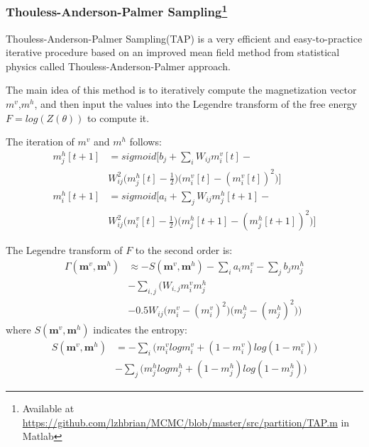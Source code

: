 
\subsubsection{Thouless-Anderson-Palmer Sampling\protect\footnote{Available at \protect\url{https://github.com/lzhbrian/MCMC/blob/master/src/partition/TAP.m} in Matlab}}

Thouless-Anderson-Palmer Sampling(TAP)\cite{gabrie2015training} is a very efficient and easy-to-practice iterative procedure based on an improved mean field method from statistical physics called Thouless-Anderson-Palmer approach.

The main idea of this method is to iteratively compute the magnetization vector $m^{v}$,$m^{h}$, and then input the values into the Legendre transform of the free energy $F=log(Z(\theta))$ to compute it.

The iteration of $m^{v}$ and $m^{h}$ follows:
\begin{equation}
\begin{aligned}
m^{h}_{j}{[t+1]} & = sigmoid\Bigg[b_{j} + \sum_{i}W_{ij}m^{v}_{i}{[t]} - \\
& W^{2}_{ij} \Bigg(m^{h}_{j}{[t] - \frac{1}{2}} \Bigg) \Big(m^{v}_{i}{[t]}-(m^{v}_{i}{[t]})^{2} \Big) \Bigg] \\ 
m^{h}_{i}{[t+1]} & = sigmoid\Bigg[a_{i} + \sum_{j}W_{ij}m^{h}_{j}{[t+1]} - \\
& W^{2}_{ij} \Bigg(m^{v}_{i}{[t] - \frac{1}{2}} \Bigg) \Big(m^{h}_{j}{[t+1]}-(m^{h}_{j}{[t+1]})^{2} \Big) \Bigg]
\end{aligned}
\end{equation}

The Legendre transform of $F$ to the second order is:
\begin{equation}
\begin{split}
\Gamma(\mathbf m^{v},\mathbf m^{h}) &\approx - S(\mathbf m^{v},\mathbf m^{h}) - \sum_{i} a_{i}m^{v}_{i} - \sum_{j} b_{j}m^{h}_{j} \\
& - \sum_{i,j} \Bigg( W_{i,j}m^{v}_{i}m^{h}_{j} \\
& - 0.5W_{ij}\Big(m^{v}_{i}-(m^{v}_{i})^2\Big)\Big(m^{h}_{j}-(m^{h}_{j})^2\Big) \Bigg)
\end{split}
\end{equation}
where $S(\mathbf m^{v},\mathbf m^{h})$ indicates the entropy:
\begin{equation}
\begin{split}
S(\mathbf m^{v},\mathbf m^{h}) &= - \sum_{i} \Bigg(m^{v}_{i}logm^{v}_{i} + (1-m^{v}_{i})log(1-m^{v}_{i}) \Bigg) \\
&- \sum_{j} \Bigg(m^{h}_{j}logm^{h}_{j} + (1-m^{h}_{j})log(1-m^{h}_{j}) \Bigg)
\end{split}
\end{equation}

